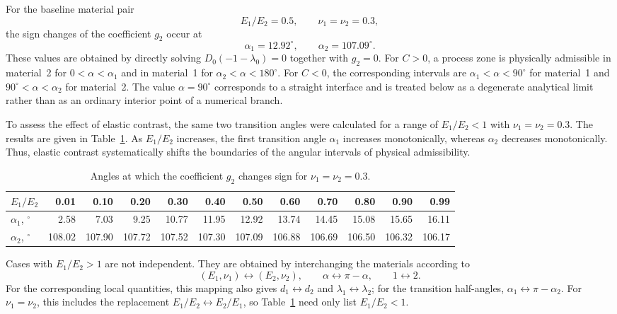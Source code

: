 \documentclass[pdflatex,onecolumn,sn-mathphys-ay]{sn-jnl}
\begin{document}
For the baseline material pair
\begin{equation*}
  E_1/E_2=0.5,\qquad \nu_1=\nu_2=0.3,
\end{equation*}
the sign changes of the coefficient $g_2$ occur at
\begin{equation*}
  \alpha_1=12.92^\circ,\qquad
  \alpha_2=107.09^\circ.
\end{equation*}
These values are obtained by directly solving
$D_0(-1-\lambda_0)=0$ together with $g_2=0$. For $C>0$, a process zone
is physically admissible in material~2 for $0<\alpha<\alpha_1$ and in
material~1 for $\alpha_2<\alpha<180^\circ$. For $C<0$, the corresponding
intervals are $\alpha_1<\alpha<90^\circ$ for material~1 and
$90^\circ<\alpha<\alpha_2$ for material~2. The value
$\alpha=90^\circ$ corresponds to a straight interface and is treated
below as a degenerate analytical limit rather than as an ordinary
interior point of a numerical branch.

To assess the effect of elastic contrast, the same two transition angles
were calculated for a range of $E_1/E_2<1$ with
$\nu_1=\nu_2=0.3$. The results are given in
Table~\ref{tab:g2-transition-angles}. As $E_1/E_2$ increases, the first
transition angle $\alpha_1$ increases monotonically, whereas $\alpha_2$
decreases monotonically. Thus, elastic contrast systematically shifts
the boundaries of the angular intervals of physical admissibility.

\begin{table}[htbp]
  \centering
  \caption{Angles at which the coefficient $g_2$ changes sign for
  $\nu_1=\nu_2=0.3$.}
  \label{tab:g2-transition-angles}
  \scriptsize
  \setlength{\tabcolsep}{2.6pt}
  \begin{tabular}{@{}lrrrrrrrrrrr@{}}
    \toprule
    $E_1/E_2$ & 0.01 & 0.10 & 0.20 & 0.30 & 0.40 & 0.50 & 0.60 & 0.70 & 0.80 & 0.90 & 0.99 \\
    \midrule
    $\alpha_1$, $^\circ$ & 2.58 & 7.03 & 9.25 & 10.77 & 11.95 & 12.92 & 13.74 & 14.45 & 15.08 & 15.65 & 16.11 \\
    $\alpha_2$, $^\circ$ & 108.02 & 107.90 & 107.72 & 107.52 & 107.30 & 107.09 & 106.88 & 106.69 & 106.50 & 106.32 & 106.17 \\
    \bottomrule
  \end{tabular}
\end{table}


Cases with $E_1/E_2>1$ are not independent. They are obtained by
interchanging the materials according to
\begin{equation*}
  (E_1,\nu_1)\leftrightarrow(E_2,\nu_2),
  \qquad
  \alpha\leftrightarrow\pi-\alpha,
  \qquad
  1\leftrightarrow2.
\end{equation*}
For the corresponding local quantities, this mapping also gives
$d_1\leftrightarrow d_2$ and
$\lambda_1\leftrightarrow\lambda_2$; for the transition half-angles,
$\alpha_1\leftrightarrow\pi-\alpha_2$. For $\nu_1=\nu_2$, this
includes the replacement
$E_1/E_2\leftrightarrow E_2/E_1$, so Table~\ref{tab:g2-transition-angles}
need only list $E_1/E_2<1$.
\end{document}
